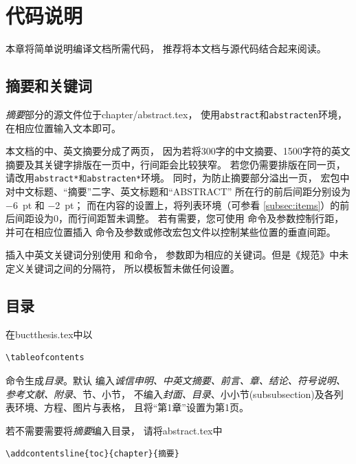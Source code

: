 \chapter{代码说明}\label{chap:CodeIntro}
本章将简单说明编译文档所需代码，
推荐将本文档与源代码结合起来阅读。


\section{摘要和关键词}\label{sec:abstract}
    \emph{摘要}部分的源文件位于\textsf{chapter/abstract.tex}，
    使用\texttt{abstract}和\texttt{abstracten}环境，在相应位置输入文本即可。

    本文档的中、英文摘要分成了两页，
    因为若将300字的中文摘要、1500字符的英文摘要及其关键字排版在一页中，行间距会比较狭窄。
    若您仍需要排版在同一页，请改用\texttt{abstract*和abstracten*}环境。
    同时，为防止摘要部分溢出一页，
    宏包中对中文标题、``摘要''二字、英文标题和``ABSTRACT''
    所在行的前后间距分别设为 \SI{-6}{pt} 和 \SI{-2}{pt}；
    而在内容的设置上，将列表环境（可参看 \ref{subsec:items}）的前后间距设为0，而行间距暂未调整。
    若有需要，您可使用  命令及参数控制行距，
    并可在相应位置插入  命令及参数或修改宏包文件以控制某些位置的垂直间距。

    插入中英文关键词分别使用 和命令，
    参数即为相应的关键词。但是《规范》中未定义关键词之间的分隔符，
    所以模板暂未做任何设置。


\section{目录}\label{sec:content}
    在\textsf{buctthesis.tex}中以

    \begin{lstlisting}[firstnumber=42]
\tableofcontents
    \end{lstlisting}
    命令生成\emph{目录}。默认
    编入\emph{诚信申明、中英文摘要、前言、章、结论、符号说明、参考文献、附录}、节、小节，
    不编入\emph{封面、目录}、小小节(subsubsection)及各列表环境、方程、图片与表格，
    且将``第1章''设置为第1页。
    
    若不需要需要将\emph{摘要}编入目录，
    请将\textsf{abstract.tex}中

	\begin{lstlisting}[numbers=none]
\addcontentsline{toc}{chapter}{摘要}
    \end{lstlisting}
    

